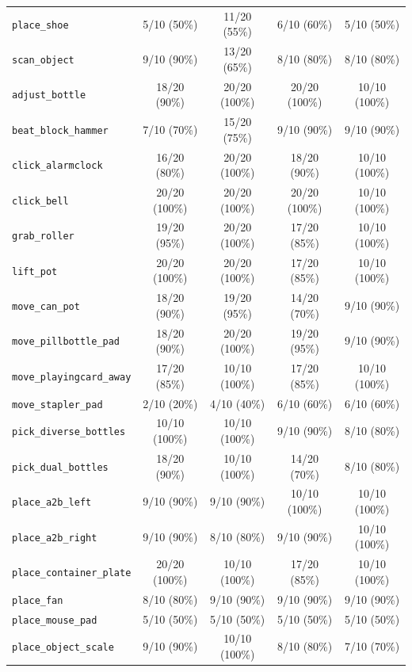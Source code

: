 \begin{table}[H]
{\begin{tabular}{lcccc}
        \texttt{place\_shoe} & 5/10 (50\%) & 11/20 (55\%) & 6/10 (60\%) & 5/10 (50\%) \\
        \texttt{scan\_object} & 9/10 (90\%) & 13/20 (65\%) & 8/10 (80\%) & 8/10 (80\%) \\
        \texttt{adjust\_bottle} & 18/20 (90\%) & 20/20 (100\%) & 20/20 (100\%) & 10/10 (100\%) \\
        \texttt{beat\_block\_hammer} & 7/10 (70\%) & 15/20 (75\%) & 9/10 (90\%) & 9/10 (90\%) \\
        \texttt{click\_alarmclock} & 16/20 (80\%) & 20/20 (100\%) & 18/20 (90\%) & 10/10 (100\%) \\
        \texttt{click\_bell} & 20/20 (100\%) & 20/20 (100\%) & 20/20 (100\%) & 10/10 (100\%) \\
        \texttt{grab\_roller} & 19/20 (95\%) & 20/20 (100\%) & 17/20 (85\%) & 10/10 (100\%) \\
        \texttt{lift\_pot} & 20/20 (100\%) & 20/20 (100\%) & 17/20 (85\%) & 10/10 (100\%) \\
        \texttt{move\_can\_pot} & 18/20 (90\%) & 19/20 (95\%) & 14/20 (70\%) & 9/10 (90\%) \\
        \texttt{move\_pillbottle\_pad} & 18/20 (90\%) & 20/20 (100\%) & 19/20 (95\%) & 9/10 (90\%) \\
        \texttt{move\_playingcard\_away} & 17/20 (85\%) & 10/10 (100\%) & 17/20 (85\%) & 10/10 (100\%) \\
        \texttt{move\_stapler\_pad} & 2/10 (20\%) & 4/10 (40\%) & 6/10 (60\%) & 6/10 (60\%) \\
        \texttt{pick\_diverse\_bottles} & 10/10 (100\%) & 10/10 (100\%) & 9/10 (90\%) & 8/10 (80\%) \\
        \texttt{pick\_dual\_bottles} & 18/20 (90\%) & 10/10 (100\%) & 14/20 (70\%) & 8/10 (80\%) \\
        \texttt{place\_a2b\_left} & 9/10 (90\%) & 9/10 (90\%) & 10/10 (100\%) & 10/10 (100\%) \\
        \texttt{place\_a2b\_right} & 9/10 (90\%) & 8/10 (80\%) & 9/10 (90\%) & 10/10 (100\%) \\
        \texttt{place\_container\_plate} & 20/20 (100\%) & 10/10 (100\%) & 17/20 (85\%) & 10/10 (100\%) \\
        \texttt{place\_fan} & 8/10 (80\%) & 9/10 (90\%) & 9/10 (90\%) & 9/10 (90\%) \\
        \texttt{place\_mouse\_pad} & 5/10 (50\%) & 5/10 (50\%) & 5/10 (50\%) & 5/10 (50\%) \\
        \texttt{place\_object\_scale} & 9/10 (90\%) & 10/10 (100\%) & 8/10 (80\%) & 7/10 (70\%) \\

\end{tabular}}
\end{table}
